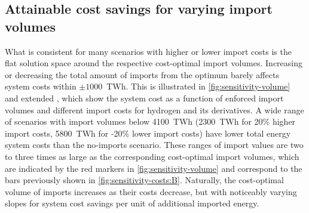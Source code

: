 \begin{figure}
\end{figure}

\subsection*{Attainable cost savings for varying import volumes}

What is consistent for many scenarios with higher or lower import costs is the
flat solution space around the respective cost-optimal import volumes.
Increasing or decreasing the total amount of imports from the optimum barely
affects system costs within $\pm 1000$~TWh. This is illustrated in
\cref{fig:sensitivity-volume} and extended
,
which show the system cost as a function of enforced import volumes and
different import costs for hydrogen and its derivatives. A wide range of
scenarios with import volumes below 4100~TWh (2300~TWh for 20\% higher import
costs, 5800~TWh for -20\% lower import costs) have lower total energy system
costs than the no-imports scenario. These ranges of import values are two to
three times as large as the corresponding cost-optimal import volumes, which are
indicated by the red markers in \cref{fig:sensitivity-volume} and correspond to
the bars previously shown in \cref{fig:sensitivity-costs:B}. Naturally, the
cost-optimal volume of imports increases as their costs decrease, but with
noticeably varying slopes for system cost savings per unit of additional
imported energy.

